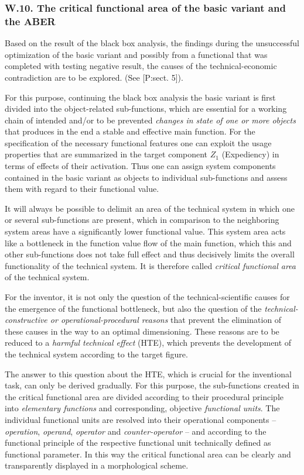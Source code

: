 \documentclass[11pt,a4paper]{article}
\begin{document}
\subsubsection*{W.10. The critical functional area of the basic variant and
  the ABER}

Based on the result of the black box analysis, the findings during the
unsuccessful optimization of the basic variant and possibly from a functional
that was completed with testing negative result, the causes of the
technical-economic contradiction are to be explored. (See [P:sect. 5]).

For this purpose, continuing the black box analysis the basic variant is first
divided into the object-related sub-functions, which are essential for a
working chain of intended and/or to be prevented \emph{changes in state of one
  or more objects} that produces in the end a stable and effective main
function.  For the specification of the necessary functional features one can
exploit the usage properties that are summarized in the target component $Z_1$
(Expediency) in terms of effects of their activation. Thus one can assign
system components contained in the basic variant as objects to individual
sub-functions and assess them with regard to their functional value.

It will always be possible to delimit an area of the technical system in which
one or several sub-functions are present, which in comparison to the
neighboring system areas have a significantly lower functional value. This
system area acts like a bottleneck in the function value flow of the main
function, which this and other sub-functions does not take full effect and
thus decisively limits the overall functionality of the technical system. It
is therefore called \emph{critical functional area} of the technical system.

For the inventor, it is not only the question of the technical-scientific
causes for the emergence of the functional bottleneck, but also the question
of the \emph{technical-constructive or operational-procedural reasons} that
prevent the elimination of these causes in the way to an optimal dimensioning.
These reasons are to be reduced to a \emph{harmful technical effect} (HTE),
which prevents the development of the technical system according to the target
figure.

The answer to this question about the HTE, which is crucial for the
inventional task, can only be derived gradually. For this purpose, the
sub-functions created in the critical functional area are divided according to
their procedural principle into \emph{elementary functions} and corresponding,
objective \emph{functional units}. The individual functional units are
resolved into their operational components -- \emph{operation},
\emph{operand}, \emph{operator} and \emph{counter-operator} -- and according
to the functional principle of the respective functional unit technically
defined as functional parameter. In this way the critical functional area can
be clearly and transparently displayed in a morphological scheme.
\end{document}
